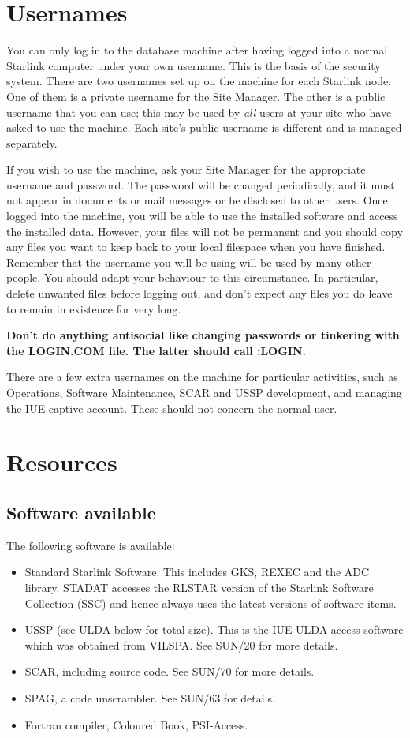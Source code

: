\section{Usernames}

You can only log in to
the database machine after having logged into a
normal Starlink computer under your own username.
This is the basis of the security system.
There are two usernames set up on the machine for each
Starlink node.
One of them is a private username for the Site Manager.
The other is a public username that you can use; this may be used
by {\em all} users at your site who have asked to use the machine.
Each site's public username is different and is managed separately.

If you wish to use the machine, ask your Site Manager for the appropriate
username and password.
The password will be changed periodically, and it must not appear in documents
or mail messages or be disclosed to other users.
Once logged into the machine, you will be able to use the installed software and
access the installed data.
However, your files will not be permanent and you should copy any files you
want to keep back to your local filespace when you have finished.
Remember that the username you will be using will be used by many other
people.
You should adapt your behaviour to this circumstance.
In particular, delete unwanted files before logging out, and don't expect
any files you do leave to remain in existence for very long.

{\bf Don't do anything antisocial like changing passwords or tinkering with the
LOGIN.COM file. The latter should call \@SSC:LOGIN.}

There are a few extra usernames on the machine for particular activities,
such as Operations, Software Maintenance, SCAR and USSP development, and
managing the IUE captive account.
These should not concern the normal user.

\section{Resources}

\subsection{Software available}

The following software is available:
\begin{itemize}
\item Standard Starlink Software.
This includes GKS, REXEC and the ADC library.
STADAT accesses the RLSTAR version of the Starlink Software
Collection (SSC) and hence always uses the
latest versions of software items.
\item USSP (see ULDA below for total size).
This is the IUE ULDA access software which was obtained from VILSPA.
See SUN/20 for more details.
\item SCAR, including source code.
See SUN/70 for more details.
\item SPAG, a code unscrambler. See SUN/63 for details.
\item Fortran compiler, Coloured Book, PSI-Access.
\end{itemize}


